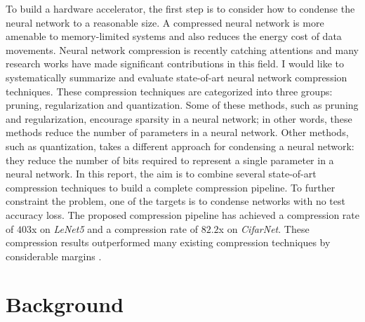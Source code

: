 \documentclass[a4paper,12pt]{report}
\begin{document}
To build a hardware accelerator, the first step is to consider how to condense
the neural network to a reasonable size.
A compressed neural network is more amenable to memory-limited systems and also
reduces the energy cost of data movements.
Neural network compression is recently catching attentions and many research
works have made significant contributions in this field.
I would like to systematically summarize and evaluate state-of-art neural network compression
techniques.
These compression techniques are categorized into three groups:
pruning, regularization and quantization.
Some of these methods, such as pruning and regularization, encourage sparsity
in a neural network; in other words, these methods reduce the number of parameters
in a neural network.
Other methods, such as quantization, takes a different approach for condensing
a neural network: they reduce the number of bits required to represent a single
parameter in a neural network.
In this report, the aim is to combine several state-of-art compression techniques
to build a complete compression pipeline.
To further constraint the problem, one of the targets is to condense networks
with no test accuracy loss.
The proposed compression pipeline has achieved a compression rate of $403$x on
\textit{LeNet5} and a compression rate of $82.2$x on \textit{CifarNet}.
These compression results outperformed many existing compression techniques
by considerable margins \cite{Han15,Guo}.

\chapter{Background}
\end{document}

